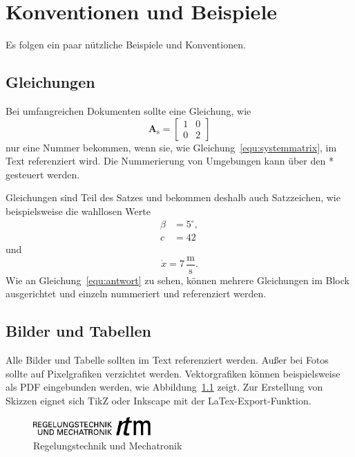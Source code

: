 \chapter{Konventionen und Beispiele}
Es folgen ein paar nützliche Beispiele und Konventionen.

\section{Gleichungen} \label{sec:gleichungen}
Bei umfangreichen Dokumenten sollte eine Gleichung, wie
%
\begin{equation} \label{equ:systemmatrix}
	\mathbf{A}_\mathrm{s} = \begin{bmatrix}1 & 0 \\ 0 & 2\end{bmatrix}
\end{equation}
%
nur eine Nummer bekommen, wenn sie, wie Gleichung~\eqref{equ:systemmatrix}, im Text referenziert wird. Die Nummerierung von Umgebungen kann über den * gesteuert werden.

Gleichungen sind Teil des Satzes und bekommen deshalb auch Satzzeichen, wie beispielsweise die wahllosen Werte
%
\begin{align}
	\beta &= 5^{\circ}, \nonumber  \\
	c &= 42 \label{equ:antwort} 
\end{align}
%
und
\begin{equation*}
	\dot{x} = 7 \, \mathrm{\frac{m}{s}}.
\end{equation*}
Wie an Gleichung~\eqref{equ:antwort} zu sehen, können mehrere Gleichungen im Block ausgerichtet und einzeln nummeriert und referenziert werden.

\section{Bilder und Tabellen}
Alle Bilder und Tabelle sollten im Text referenziert werden.
Außer bei Fotos sollte auf Pixelgrafiken verzichtet werden. Vektorgrafiken können beispielsweise als PDF eingebunden werden, wie Abbildung~\ref{fig:rtm} zeigt.
Zur Erstellung von Skizzen eignet sich TikZ oder Inkscape mit der LaTex-Export-Funktion.

\begin{figure} %
	\centering
	\includegraphics[width=0.4\textwidth]{rtm_mit_schrift.pdf}
	\caption{Regelungstechnik und Mechatronik}
	\label{fig:rtm}
\end{figure}

